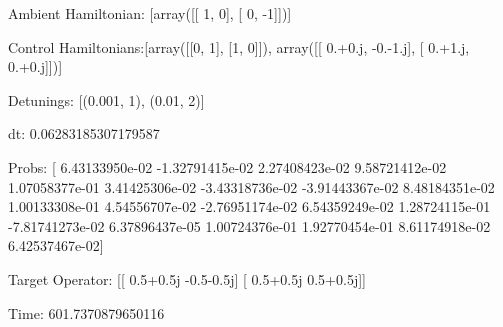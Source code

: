 \documentclass{article}
\begin{document}
    

\newpage

Ambient Hamiltonian: [array([[ 1,  0],
       [ 0, -1]])]

Control Hamiltonians:[array([[0, 1],
       [1, 0]]), array([[ 0.+0.j, -0.-1.j],
       [ 0.+1.j,  0.+0.j]])]

Detunings: [(0.001, 1), (0.01, 2)]

 dt: 0.06283185307179587

Probs: [  6.43133950e-02  -1.32791415e-02   2.27408423e-02   9.58721412e-02
   1.07058377e-01   3.41425306e-02  -3.43318736e-02  -3.91443367e-02
   8.48184351e-02   1.00133308e-01   4.54556707e-02  -2.76951174e-02
   6.54359249e-02   1.28724115e-01  -7.81741273e-02   6.37896437e-05
   1.00724376e-01   1.92770454e-01   8.61174918e-02   6.42537467e-02]

Target Operator: [[ 0.5+0.5j -0.5-0.5j]
 [ 0.5+0.5j  0.5+0.5j]]

Time: 601.7370879650116
\end{document}
